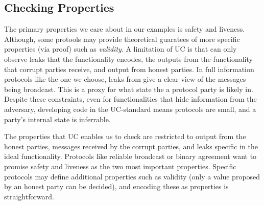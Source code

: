 \subsection{Checking Properties}
The primary properties we care about in our examples is safety and liveness.
Although, some protools may provide theoretical guaratees of more specific properties (via proof) such as \emph{validity}. 
A limitation of UC is that \Z can only observe leaks that the functionality encodes, the outputs from the functionality that corrupt parties receive, and output from honest parties.
In full information protocols like the one we choose, leaks from \Fchan give a clear view of the messages being broadcast. 
This is a proxy for what state the a protocol party is likely in.
Despite these constraints, even for functionalities that hide information from the adversary, developing code in the UC-standard means protocols are small, and a party's internal state is inferrable.

The properties that UC enables us to check are restricted to output from the honest parties, messages received by the corrupt parties, and leaks specific in the ideal functionality. 
Protocols like reliable broadcast or binary agreement want to promise safety and liveness as the two most important properties.
Specific protocols may define additional properties such as validity (only a value proposed by an honest party can be decided), and encoding these as properties is straightforward.

